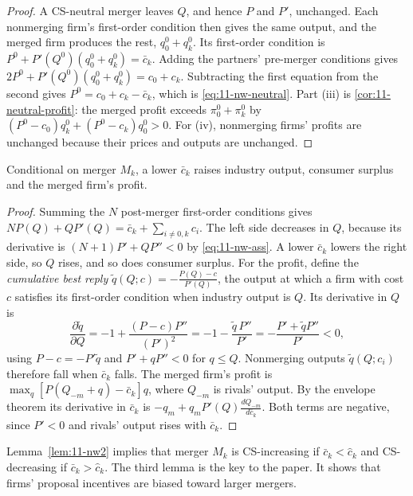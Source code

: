 \begin{proof}
A CS-neutral merger leaves $Q$, and hence $P$ and $P'$, unchanged. Each nonmerging firm's first-order condition then
gives the same output, and the merged firm produces the rest, $q_0^0 + q_k^0$. Its first-order condition is $P^0 +
P'(Q^0)(q_0^0 + q_k^0) = \bar c_k$. Adding the partners' pre-merger conditions gives $2P^0 + P'(Q^0)(q_0^0 + q_k^0) =
c_0 + c_k$. Subtracting the first equation from the second gives $P^0 = c_0 + c_k - \bar c_k$, which is
\eqref{eq:11-nw-neutral}. Part (iii) is \cref{cor:11-neutral-profit}: the merged profit exceeds $\pi_0^0 + \pi_k^0$ by
$(P^0 - c_0)q_k^0 + (P^0 - c_k)q_0^0 > 0$. For (iv), nonmerging firms' profits are unchanged because their prices and
outputs are unchanged.
\end{proof}

\begin{lemma}\label{lem:11-nw2}
Conditional on merger $M_k$, a lower $\bar c_k$ raises industry output, consumer surplus and the merged firm's profit.
\end{lemma}

\begin{proof}
Summing the $N$ post-merger first-order conditions gives $NP(Q) + QP'(Q) = \bar c_k + \sum_{i \neq 0, k}c_i$. The
left side decreases in $Q$, because its derivative is $(N + 1)P' + QP'' < 0$ by \eqref{eq:11-nw-ass}. A lower
$\bar c_k$ lowers the right side, so $Q$ rises, and so does consumer surplus. For the profit, define the
\emph{cumulative best reply} $\tilde q(Q; c) = -\frac{P(Q) - c}{P'(Q)}$, the output at which a firm with cost $c$
satisfies its first-order condition when industry output is $Q$. Its derivative in $Q$ is
\begin{equation*}
\frac{\partial\tilde q}{\partial Q} = -1 + \frac{(P - c)P''}{(P')^2} = -1 - \frac{\tilde q\,P''}{P'} =
-\frac{P' + \tilde q P''}{P'} < 0,
\end{equation*}
using $P - c = -P'\tilde q$ and $P' + qP'' < 0$ for $q \le Q$. Nonmerging outputs $\tilde q(Q; c_i)$ therefore fall
when $\bar c_k$ falls. The merged firm's profit is $\max_q[P(Q_{-m} + q) - \bar c_k]q$, where $Q_{-m}$ is rivals'
output. By the envelope theorem its derivative in $\bar c_k$ is $-q_m + q_m P'(Q)\frac{dQ_{-m}}{d\bar c_k}$. Both terms
are negative, since $P' < 0$ and rivals' output rises with $\bar c_k$.
\end{proof}

Lemma~\ref{lem:11-nw2} implies that merger $M_k$ is CS-increasing if $\bar c_k < \hat c_k$ and CS-decreasing if
$\bar c_k > \hat c_k$. The third lemma is the key to the paper. It shows that firms' proposal incentives are biased
toward larger mergers.

